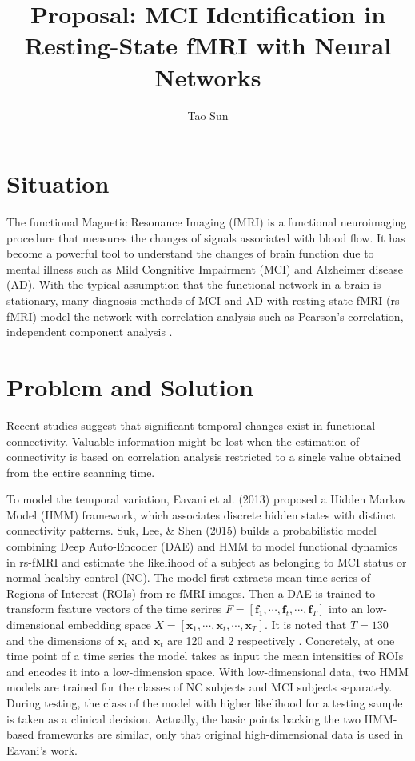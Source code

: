 \documentclass[12pt, oneside]{article}   	%
\title{Proposal: MCI Identification in Resting-State fMRI with Neural Networks}
\author{Tao Sun}
\begin{document}
\maketitle


\section{Situation}
\begin{flushleft}
The functional Magnetic Resonance Imaging (fMRI) is a functional neuroimaging procedure that measures the changes of signals associated with blood flow. It has become a powerful tool to understand the changes of brain function due to mental illness such as Mild Congnitive Impairment (MCI) and Alzheimer disease (AD). With the typical assumption that the functional network in a brain is stationary, many diagnosis methods of MCI and AD with resting-state fMRI (rs-fMRI) model the network with correlation analysis such as Pearson's correlation, independent component analysis \cite{li}. 
\end{flushleft}


\section{Problem and Solution}
\begin{flushleft}
Recent studies \cite{hutch} suggest that significant temporal changes exist in functional connectivity. Valuable information might be lost when the estimation of connectivity is based on correlation analysis restricted to a single value obtained from the entire scanning time.
\end{flushleft}


\begin{flushleft}
To model the temporal variation, Eavani et al. (2013) proposed a Hidden Markov Model (HMM) framework, which associates discrete hidden states with distinct connectivity patterns. Suk, Lee, \& Shen (2015) builds a probabilistic model combining Deep Auto-Encoder (DAE) and HMM to model functional dynamics in rs-fMRI and estimate the likelihood of a subject as belonging to MCI status or normal healthy control (NC). The model first extracts mean time series of Regions of Interest (ROIs) from re-fMRI images.  Then a DAE is trained to transform feature vectors of the time serires $ F = \left[  \textbf{f}_1, \cdots, \textbf{f}_t, \cdots, \textbf{f}_T \right] $ into an low-dimensional embedding space $ X = \left[  \textbf{x}_1, \cdots, \textbf{x}_t, \cdots, \textbf{x}_T \right]$. It is noted that $T=130$ and the dimensions of $\textbf{x}_t$ and $\textbf{x}_t$ are 120 and 2 respectively \cite{suk}. Concretely, at one time point of a time series the model takes as input the mean intensities of ROIs and encodes it into a low-dimension space. With low-dimensional data, two HMM models are trained for the classes of NC subjects and MCI subjects separately. During testing, the class of the model with higher likelihood for a testing sample is taken as a clinical decision. Actually, the basic points backing the two HMM-based frameworks are similar, only that original high-dimensional data is used in Eavani's work.
\end{flushleft}
\end{document}
